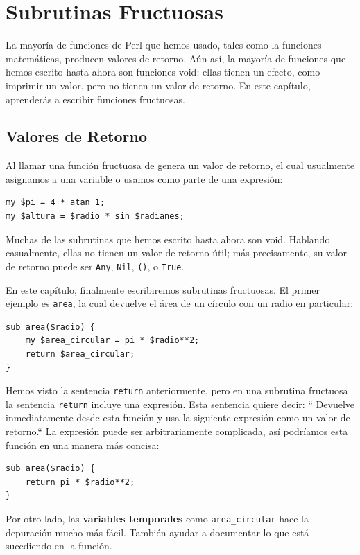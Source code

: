 
\chapter{Subrutinas Fructuosas}
\label{fruitchap}

La mayoría de funciones de Perl que hemos usado, tales como
la funciones matemáticas, producen valores de retorno. Aún así,
la mayoría de funciones que hemos escrito hasta ahora son funciones
void: ellas tienen un efecto, como imprimir un valor,
pero no tienen un valor de retorno. En este capítulo, aprenderás
a escribir funciones fructuosas.

\section{Valores de Retorno}

Al llamar una función fructuosa de genera un valor de retorno,
el cual usualmente asignamos a una variable o usamos como 
parte de una expresión:

\begin{verbatim}
my $pi = 4 * atan 1;
my $altura = $radio * sin $radianes;
\end{verbatim}
%
Muchas de las subrutinas que hemos escrito hasta ahora son
void. Hablando casualmente, ellas no tienen un valor de 
retorno útil; más precisamente, su valor de retorno puede
ser {\tt Any}, {\tt Nil}, {\tt ()}, o {\tt True}.

En este capítulo, finalmente escribiremos subrutinas fructuosas. 
El primer ejemplo es {\tt area}, la cual devuelve el área de un 
círculo con un radio en particular:

\begin{verbatim}
sub area($radio) {
    my $area_circular = pi * $radio**2;
    return $area_circular;
}
\end{verbatim}
%
Hemos visto la sentencia {\tt return} anteriormente,
pero en una subrutina fructuosa la sentencia {\tt return} 
incluye una expresión. Esta sentencia quiere decir: ``
Devuelve inmediatamente desde esta función y usa la siguiente
expresión como un valor de retorno.``
La expresión puede ser arbitrariamente complicada, así podríamos
esta función en una manera más concisa:

\begin{verbatim}
sub area($radio) {
    return pi * $radio**2;
}
\end{verbatim}
%

Por otro lado, las {\bf variables temporales} 
como \verb|area_circular| hace la depuración mucho más
fácil. También ayudar a documentar lo que está sucediendo
en la función.

